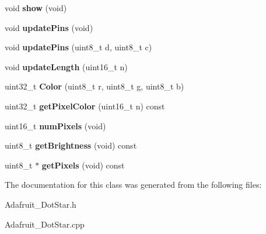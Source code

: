 \begin{DoxyCompactItemize}
void {\bfseries show} (void)
\item 
\mbox{\label{class_adafruit___dot_star_a919180c79ca0ead77af98b4881ae4aff}} 
void {\bfseries update\+Pins} (void)
\item 
\mbox{\label{class_adafruit___dot_star_a92efc8e9f032c986830845971eafc561}} 
void {\bfseries update\+Pins} (uint8\+\_\+t d, uint8\+\_\+t c)
\item 
\mbox{\label{class_adafruit___dot_star_afe4382f56136f5f5ccf2e2604e2e269c}} 
void {\bfseries update\+Length} (uint16\+\_\+t n)
\item 
\mbox{\label{class_adafruit___dot_star_a9853ada45baf0e770fc44cac891c85db}} 
uint32\+\_\+t {\bfseries Color} (uint8\+\_\+t r, uint8\+\_\+t g, uint8\+\_\+t b)
\item 
\mbox{\label{class_adafruit___dot_star_a0b56b829364a602e0faf0e653fe0e50d}} 
uint32\+\_\+t {\bfseries get\+Pixel\+Color} (uint16\+\_\+t n) const
\item 
\mbox{\label{class_adafruit___dot_star_ae9230be951873bbb22dbc33dced7eb3c}} 
uint16\+\_\+t {\bfseries num\+Pixels} (void)
\item 
\mbox{\label{class_adafruit___dot_star_a458935d8404618422fe29b8011f5ca97}} 
uint8\+\_\+t {\bfseries get\+Brightness} (void) const
\item 
\mbox{\label{class_adafruit___dot_star_a4432f4e4be0e7b3c73dfeedb4035343b}} 
uint8\+\_\+t $\ast$ {\bfseries get\+Pixels} (void) const
\end{DoxyCompactItemize}


The documentation for this class was generated from the following files\+:\begin{DoxyCompactItemize}
\item 
Adafruit\+\_\+\+Dot\+Star.\+h\item 
Adafruit\+\_\+\+Dot\+Star.\+cpp\end{DoxyCompactItemize}
